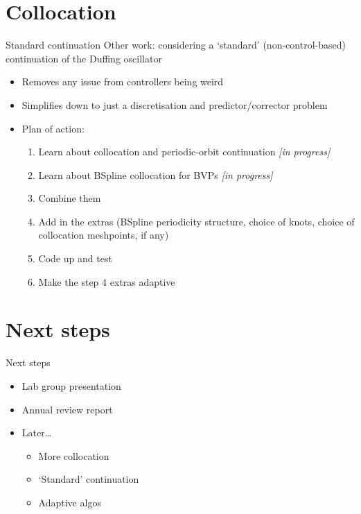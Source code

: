\documentclass[presentation]{beamer}
\begin{document}
\section{Collocation}
\label{sec:org12e0767}
\begin{frame}[label={sec:orgc3102a0}]{Standard continuation}
Other work: considering a `standard' (non-control-based) continuation of the Duffing oscillator
\vfill
\begin{itemize}
\item Removes any issue from controllers being weird
\item Simplifies down to just a discretisation and predictor/corrector problem
\end{itemize}
\vfill
\begin{itemize}
\item Plan of action:
\begin{enumerate}
\item Learn about collocation and periodic-orbit continuation \alert{\emph{[in progress]}}
\item Learn about BSpline collocation for BVPs \alert{\emph{[in progress]}}
\item Combine them
\item Add in the extras (BSpline periodicity structure, choice of knots, choice of collocation meshpoints, if any)
\item Code up and test
\item Make the step 4 extras adaptive
\end{enumerate}
\end{itemize}
\end{frame}

\section{Next steps}
\label{sec:orgefb1b43}
\begin{frame}[label={sec:orge955673}]{Next steps}
\begin{itemize}
\item Lab group presentation
\end{itemize}
\vfill
\begin{itemize}
\item Annual review report
\end{itemize}
\vfill
\begin{itemize}
\item Later\ldots{}
\begin{itemize}
\item More collocation
\item `Standard' continuation
\item Adaptive algos
\end{itemize}
\end{itemize}
\end{frame}
\end{document}

